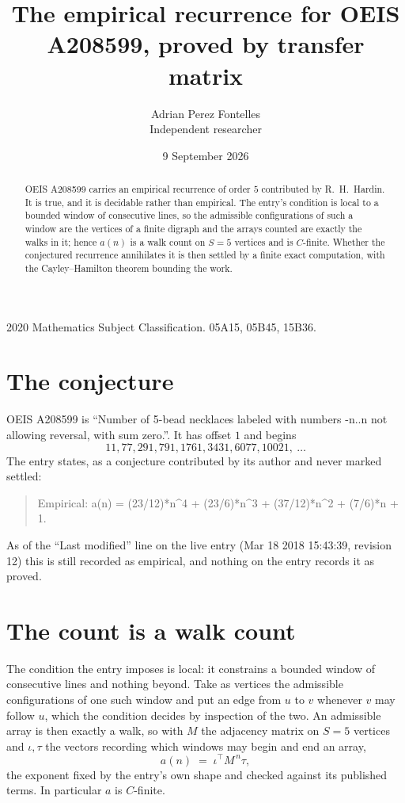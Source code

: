 \documentclass[11pt,a4paper]{article}
\title{The empirical recurrence for OEIS A208599, proved by transfer matrix}
\author{Adrian Perez Fontelles\\ \small Independent researcher}
\date{9 September 2026}
\theoremstyle{plain}
\theoremstyle{definition}
\begin{document}
\maketitle

\begin{abstract}
OEIS A208599 carries an empirical recurrence of order $5$ contributed by R.~H.~Hardin. It is
true, and it is decidable rather than empirical. The entry's condition is local to a bounded window of consecutive lines, so
the admissible configurations of such a window are the vertices of a finite digraph and the
arrays counted are exactly the walks in it; hence $a(n)$ is a walk count on $S=5$ vertices
and is $C$-finite. Whether the conjectured recurrence annihilates it is then settled by a
finite exact computation, with the Cayley--Hamilton theorem bounding the work.
\end{abstract}

\noindent\small 2020 Mathematics Subject Classification. 05A15, 05B45, 15B36.\normalsize

\section{The conjecture}

OEIS A208599 is ``Number of 5-bead necklaces labeled with numbers -n..n not allowing reversal, with sum zero.''. It has offset $1$ and begins
\[
11, 77, 291, 791, 1761, 3431, 6077, 10021,\ \dots
\]
The entry states, as a conjecture contributed by its author and never marked settled:
\begin{quote}
Empirical: a(n) = (23/12)*n\^{}4 + (23/6)*n\^{}3 + (37/12)*n\^{}2 + (7/6)*n + 1.
\end{quote}
As of the ``Last modified'' line on the live entry (Mar 18 2018 15:43:39, revision 12) this is still
recorded as empirical, and nothing on the entry records it as proved.

\section{The count is a walk count}

The condition the entry imposes is local: it constrains a bounded window of consecutive lines and nothing beyond. Take as
vertices the admissible configurations of one such window and put an edge from $u$ to $v$
whenever $v$ may follow $u$, which the condition decides by inspection of the two. An
admissible array is then exactly a walk, so with $M$ the adjacency matrix on $S=5$ vertices
and $\iota,\tau$ the vectors recording which windows may begin and end an array,
\[
a(n)\;=\;\iota^{\!\top}M^{\,n}\tau ,
\]
the exponent fixed by the entry's own shape and checked against its published terms. In
particular $a$ is $C$-finite.
\end{document}
